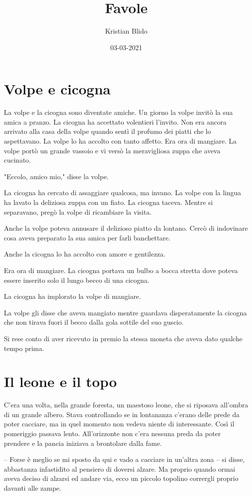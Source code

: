 \documentclass[12pt, a4paper]{article}
\title{Favole}
\author{Kristian Blido}
\date{03-03-2021}
\begin{document}
\maketitle
\section*{Volpe e cicogna}
La volpe e la cicogna sono diventate amiche. Un giorno la volpe invitò la sua amica a pranzo. La cicogna ha accettato volentieri l'invito. Non era ancora arrivato alla casa della volpe quando sentì il profumo dei piatti che lo aspettavano. La volpe lo ha accolto con tanto affetto. Era ora di mangiare. La volpe portò un grande vassoio e vi versò la meravigliosa zuppa che aveva cucinato.

"Eccolo, amico mio," disse la volpe.

La cicogna ha cercato di assaggiare qualcosa, ma invano. La volpe con la lingua ha lavato la deliziosa zuppa con un fiato. La cicogna taceva. Mentre si separavano, pregò la volpe di ricambiare la visita.

Anche la volpe poteva annusare il delizioso piatto da lontano. Cercò di indovinare cosa aveva preparato la sua amica per farli banchettare.

Anche la cicogna lo ha accolto con amore e gentilezza.

Era ora di mangiare. La cicogna portava un bulbo a bocca stretta dove poteva essere inserito solo il lungo becco di una cicogna.

La cicogna ha implorato la volpe di mangiare.

La volpe gli disse che aveva mangiato mentre guardava disperatamente la cicogna che non tirava fuori il becco dalla gola sottile del suo guscio.

Si rese conto di aver ricevuto in premio la stessa moneta che aveva dato qualche tempo prima.
\section*{Il leone e il topo}
C’era una volta, nella grande foresta, un maestoso leone, che si riposava all’ombra di un grande albero.
Stava controllando se in lontananza c’erano delle prede da poter cacciare, ma in quel momento non vedeva niente di interessante.
Così il pomeriggio passava lento. All’orizzonte non c’era nessuna preda da poter prendere e la pancia iniziava a brontolare dalla fame.

– Forse è meglio se mi sposto da qui e vado a cacciare in un’altra zona – si disse, abbastanza infastidito al pensiero di doversi alzare.
Ma proprio quando ormai aveva deciso di alzarsi ed andare via, ecco un piccolo topolino corrergli proprio davanti alle zampe.
\end{document}
